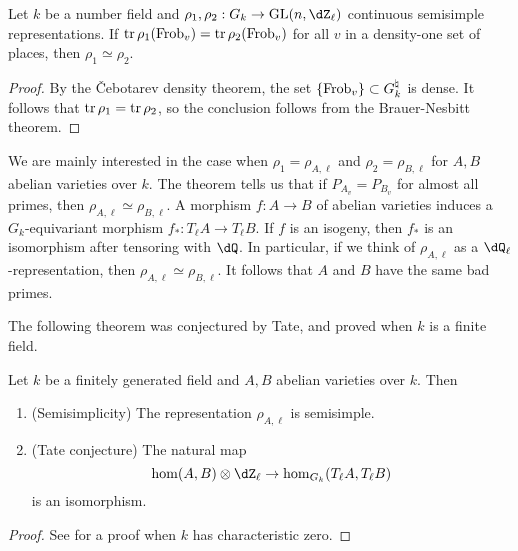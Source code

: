 \begin{theorem}\label{thm:trace-determines-rep}
Let $k$ be a number field and $\rho_1,\rho_2:G_k \to \gl{n}{\dZ_\ell}$ 
continuous semisimple representations. If 
$\operatorname{tr} \rho_1(\mathrm{Frob}_v) = \operatorname{tr} \rho_2(\mathrm{Frob}_v)$ for all $v$ in a density-one 
set of places, then $\rho_1\simeq \rho_2$. 
\end{theorem}
\begin{proof}
By the \v Cebotarev density theorem, the set $\{\mathrm{Frob}_v\}\subset G_k^\natural$ 
is dense. It follows that $\operatorname{tr} \rho_1 = \operatorname{tr} \rho_2$, so the conclusion 
follows from the Brauer-Nesbitt theorem. 
\end{proof}

We are mainly interested in the case when $\rho_1=\rho_{A,\ell}$ and 
$\rho_2=\rho_{B,\ell}$ for $A,B$ abelian varieties over $k$. The theorem tells 
us that if $P_{A_v} = P_{B_v}$ for almost all primes, then 
$\rho_{A,\ell}\simeq \rho_{B,\ell}$. A morphism $f:A\to B$ of abelian varieties 
induces a $G_k$-equivariant morphism $f_\ast:T_\ell A \to T_\ell B$. If $f$ is 
an isogeny, then $f_\ast$ is an isomorphism after tensoring with $\dQ$. In 
particular, if we think of $\rho_{A,\ell}$ as a $\dQ_\ell$-representation, then 
$\rho_{A,\ell}\simeq \rho_{B,\ell}$. It follows that $A$ and $B$ have the same 
bad primes. 

The following theorem was conjectured by Tate, and proved when $k$ is a finite 
field. 

\begin{theorem}[Faltings]
Let $k$ be a finitely generated field and $A,B$ abelian varieties over $k$. 
Then 
\begin{enumerate}
  \item (Semisimplicity) The representation  $\rho_{A,\ell}$ is semisimple. 
  \item (Tate conjecture) The natural map
    \[
      \hom(A,B)\otimes\dZ_\ell \to \hom_{G_k}(T_\ell A,T_\ell B)
    \]
    is an isomorphism. 
\end{enumerate}
\end{theorem}
\begin{proof}
See \cite{fa84} for a proof when $k$ has characteristic zero. 
\end{proof}

